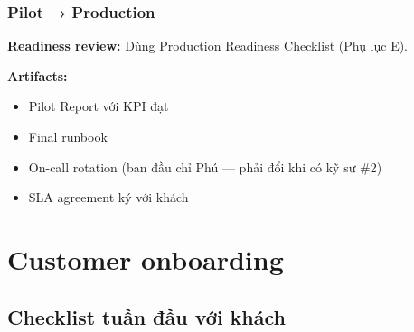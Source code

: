 \documentclass[11pt,a4paper]{article}
\begin{document}
\subsubsection*{Pilot → Production}
\textbf{Readiness review:} Dùng Production Readiness Checklist (Phụ lục E).

\textbf{Artifacts:}
\begin{itemize}
\item Pilot Report với KPI đạt
\item Final runbook
\item On-call rotation (ban đầu chỉ Phú --- phải đổi khi có kỹ sư \#2)
\item SLA agreement ký với khách
\end{itemize}

\clearpage

\section{Customer onboarding}

\subsection{Checklist tuần đầu với khách}
\end{document}
